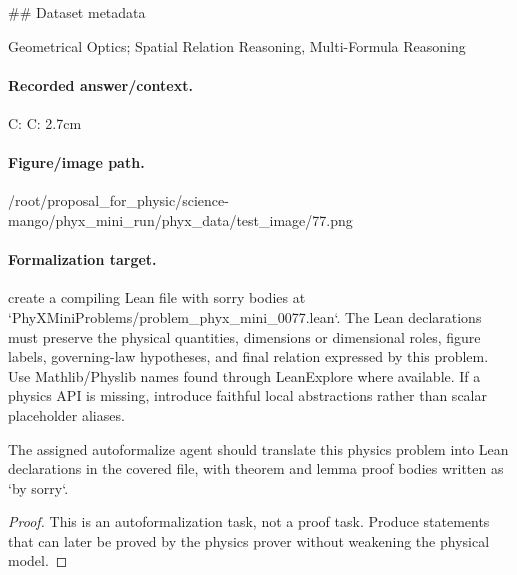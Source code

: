 \#\# Dataset metadata

Geometrical Optics; Spatial Relation Reasoning, Multi-Formula Reasoning

\paragraph{Recorded answer/context.}
C: C: 2.7cm

\paragraph{Figure/image path.}
/root/proposal\_for\_physic/science-mango/phyx\_mini\_run/phyx\_data/test\_image/77.png

\paragraph{Formalization target.}
create a compiling Lean file with sorry bodies at `PhyXMiniProblems/problem\_phyx\_mini\_0077.lean`. The Lean declarations must preserve the physical quantities, dimensions or dimensional roles, figure labels, governing-law hypotheses, and final relation expressed by this problem.
Use Mathlib/Physlib names found through LeanExplore where available. If a physics API is missing, introduce faithful local abstractions rather than scalar placeholder aliases.

\begin{theorem}
\label{thm:physics:phyx_mini_0077:target}
The assigned autoformalize agent should translate this physics problem into Lean declarations in the covered file, with theorem and lemma proof bodies written as `by sorry`.
\end{theorem}
\begin{proof}
This is an autoformalization task, not a proof task. Produce statements that can later be proved by the physics prover without weakening the physical model.
\end{proof}

